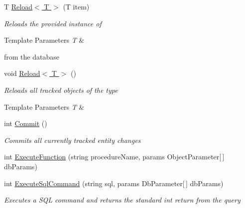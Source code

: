\begin{DoxyCompactItemize}
T \hyperlink{class_highway_1_1_data_1_1_entity_framework_1_1_tests_1_1_unit_tests_1_1_e_f_failure_context_aaec976d701f33aea494ea664b876740f}{Reload$<$ T $>$} (T item)
\begin{DoxyCompactList}\small\item\em Reloads the provided instance of 
\begin{DoxyTemplParams}{Template Parameters}
{\em T} & \\
\hline
\end{DoxyTemplParams}
from the database \end{DoxyCompactList}\item 
void \hyperlink{class_highway_1_1_data_1_1_entity_framework_1_1_tests_1_1_unit_tests_1_1_e_f_failure_context_afe085e31e4a958e02e218214d671d510}{Reload$<$ T $>$} ()
\begin{DoxyCompactList}\small\item\em Reloads all tracked objects of the type 
\begin{DoxyTemplParams}{Template Parameters}
{\em T} & \\
\hline
\end{DoxyTemplParams}
\end{DoxyCompactList}\item 
int \hyperlink{class_highway_1_1_data_1_1_entity_framework_1_1_tests_1_1_unit_tests_1_1_e_f_failure_context_acd2d366ff35b3e0002a49674e8dcb257}{Commit} ()
\begin{DoxyCompactList}\small\item\em Commits all currently tracked entity changes \end{DoxyCompactList}\item 
int \hyperlink{class_highway_1_1_data_1_1_entity_framework_1_1_tests_1_1_unit_tests_1_1_e_f_failure_context_ac44ba75ae717baba4bbc597e913f310f}{Execute\-Function} (string procedure\-Name, params Object\-Parameter\mbox{[}$\,$\mbox{]} db\-Params)
\begin{DoxyCompactList}\small\item\em \end{DoxyCompactList}\item 
int \hyperlink{class_highway_1_1_data_1_1_entity_framework_1_1_tests_1_1_unit_tests_1_1_e_f_failure_context_a9dff39898183b3a75cf083f93ae2f51d}{Execute\-Sql\-Command} (string sql, params Db\-Parameter\mbox{[}$\,$\mbox{]} db\-Params)
\begin{DoxyCompactList}\small\item\em Executes a S\-Q\-L command and returns the standard int return from the query \end{DoxyCompactList}\item 

\end{DoxyCompactItemize}
